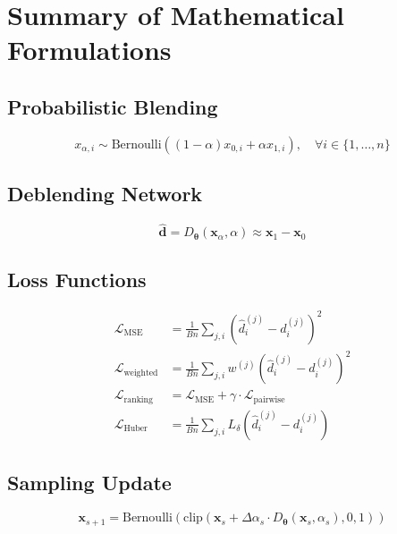 \documentclass[11pt,a4paper]{article}
\newcommand{\vx}{\mathbf{x}}
\newcommand{\vtheta}{\boldsymbol{\theta}}
\begin{document}
\section{Summary of Mathematical Formulations}

\subsection{Probabilistic Blending}
\begin{equation}
    x_{\alpha,i} \sim \text{Bernoulli}\left((1-\alpha) x_{0,i} + \alpha x_{1,i}\right), \quad \forall i \in \{1, \ldots, n\}
\end{equation}

\subsection{Deblending Network}
\begin{equation}
    \hat{\mathbf{d}} = D_\vtheta(\vx_\alpha, \alpha) \approx \vx_1 - \vx_0
\end{equation}

\subsection{Loss Functions}
\begin{align}
    \mathcal{L}_{\text{MSE}} &= \frac{1}{Bn}\sum_{j,i} \left(\hat{d}_i^{(j)} - d_i^{(j)}\right)^2 \\
    \mathcal{L}_{\text{weighted}} &= \frac{1}{Bn}\sum_{j,i} w^{(j)} \left(\hat{d}_i^{(j)} - d_i^{(j)}\right)^2 \\
    \mathcal{L}_{\text{ranking}} &= \mathcal{L}_{\text{MSE}} + \gamma \cdot \mathcal{L}_{\text{pairwise}} \\
    \mathcal{L}_{\text{Huber}} &= \frac{1}{Bn}\sum_{j,i} L_\delta\left(\hat{d}_i^{(j)} - d_i^{(j)}\right)
\end{align}

\subsection{Sampling Update}
\begin{equation}
    \vx_{s+1} = \text{Bernoulli}\left(\text{clip}\left(\vx_s + \Delta\alpha_s \cdot D_\vtheta(\vx_s, \alpha_s), 0, 1\right)\right)
\end{equation}
\end{document}
